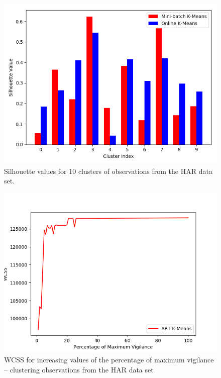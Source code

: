 \documentclass{l4proj}
\begin{document}
\begin{appendices}
\begin{figure}[H]
	\centering
    \label{fig:res20}
    \includegraphics[width=1.0\textwidth]{images/result20}
    \caption{Silhouette values for 10 clusters of observations from the HAR data set.} 
\end{figure}

\begin{figure}[H]
	\centering
    \label{fig:res13}
    \includegraphics[width=1.0\textwidth]{images/result13}
    \caption{WCSS for increasing values of the percentage of maximum vigilance -- clustering observations from the HAR data set} 
\end{figure}

\end{appendices}
\end{document}
